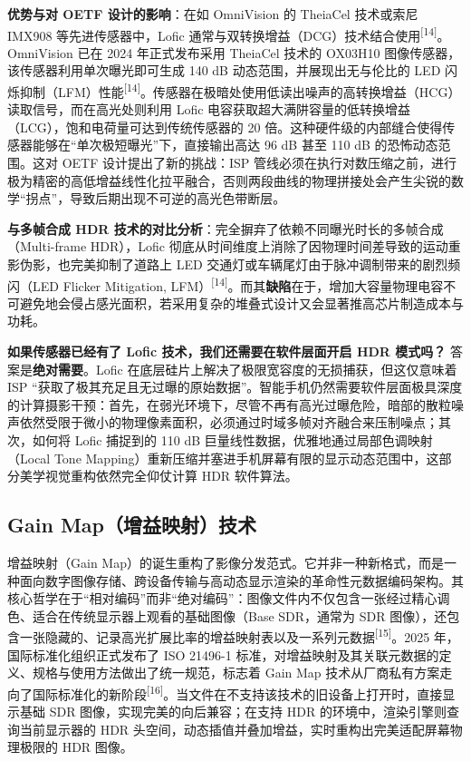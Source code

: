 \documentclass[12pt, a4paper]{ctexart}
\newcommand{\scite}[1]{\textsuperscript{[#1]}}
\begin{document}
\textbf{优势与对 OETF 设计的影响}：在如 OmniVision 的 TheiaCel 技术或索尼 IMX908 等先进传感器中，Lofic 通常与双转换增益（DCG）技术结合使用\scite{14}。OmniVision 已在 2024 年正式发布采用 TheiaCel 技术的 OX03H10 图像传感器，该传感器利用单次曝光即可生成 140 dB 动态范围，并展现出无与伦比的 LED 闪烁抑制（LFM）性能\scite{14}。传感器在极暗处使用低读出噪声的高转换增益（HCG）读取信号，而在高光处则利用 Lofic 电容获取超大满阱容量的低转换增益（LCG），饱和电荷量可达到传统传感器的 20 倍。这种硬件级的内部缝合使得传感器能够在“单次极短曝光”下，直接输出高达 96 dB 甚至 110 dB 的恐怖动态范围。这对 OETF 设计提出了新的挑战：ISP 管线必须在执行对数压缩之前，进行极为精密的高低增益线性化拉平融合，否则两段曲线的物理拼接处会产生尖锐的数学“拐点”，导致后期出现不可逆的高光色带断层。

\textbf{与多帧合成 HDR 技术的对比分析}：完全摒弃了依赖不同曝光时长的多帧合成（Multi-frame HDR），Lofic 彻底从时间维度上消除了因物理时间差导致的运动重影伪影，也完美抑制了道路上 LED 交通灯或车辆尾灯由于脉冲调制带来的剧烈频闪（LED Flicker Mitigation, LFM）\scite{14}。而其\textbf{缺陷}在于，增加大容量物理电容不可避免地会侵占感光面积，若采用复杂的堆叠式设计又会显著推高芯片制造成本与功耗。

\textbf{如果传感器已经有了 Lofic 技术，我们还需要在软件层面开启 HDR 模式吗？}
答案是\textbf{绝对需要}。Lofic 在底层硅片上解决了极限宽容度的无损捕获，但这仅意味着 ISP “获取了极其充足且无过曝的原始数据”。智能手机仍然需要软件层面极具深度的计算摄影干预：首先，在弱光环境下，尽管不再有高光过曝危险，暗部的散粒噪声依然受限于微小的物理像素面积，必须通过时域多帧对齐融合来压制噪点；其次，如何将 Lofic 捕捉到的 110 dB 巨量线性数据，优雅地通过局部色调映射（Local Tone Mapping）重新压缩并塞进手机屏幕有限的显示动态范围中，这部分美学视觉重构依然完全仰仗计算 HDR 软件算法。

\subsection{Gain Map（增益映射）技术}

增益映射（Gain Map）的诞生重构了影像分发范式。它并非一种新格式，而是一种面向数字图像存储、跨设备传输与高动态显示渲染的革命性元数据编码架构。其核心哲学在于“相对编码”而非“绝对编码”：图像文件内不仅包含一张经过精心调色、适合在传统显示器上观看的基础图像（Base SDR，通常为 SDR 图像），还包含一张隐藏的、记录高光扩展比率的增益映射表以及一系列元数据\scite{15}。2025 年，国际标准化组织正式发布了 ISO 21496-1 标准，对增益映射及其关联元数据的定义、规格与使用方法做出了统一规范，标志着 Gain Map 技术从厂商私有方案走向了国际标准化的新阶段\scite{16}。当文件在不支持该技术的旧设备上打开时，直接显示基础 SDR 图像，实现完美的向后兼容；在支持 HDR 的环境中，渲染引擎则查询当前显示器的 HDR 头空间，动态插值并叠加增益，实时重构出完美适配屏幕物理极限的 HDR 图像。
\end{document}
